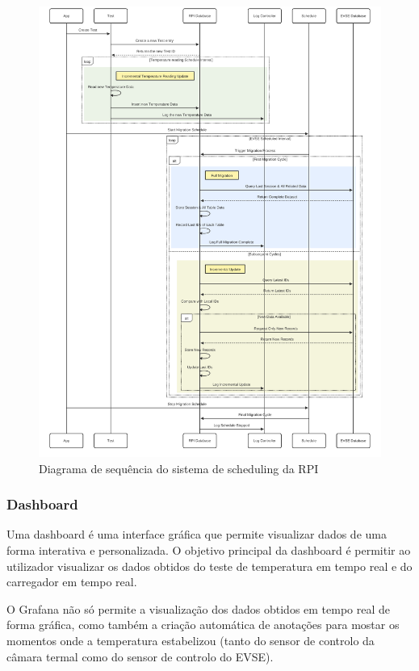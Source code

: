 \begin{figure}[H]
    \centering
    \includegraphics[scale=0.10]{figures/scheduling_2.pdf}
    \caption{Diagrama de sequência do sistema de scheduling da RPI}
    \label{fig:scheduling_2}
\end{figure}

\subsubsection{Dashboard}
Uma dashboard é uma interface gráfica que permite visualizar dados de uma forma interativa e personalizada. O objetivo principal da dashboard 
é permitir ao utilizador visualizar os dados obtidos do teste de temperatura em tempo real e do carregador em tempo real.

O Grafana não só permite a visualização dos dados obtidos em tempo real de forma gráfica, como também a criação automática de anotações
para mostar os momentos onde a temperatura estabelizou (tanto do sensor de controlo da câmara termal como do sensor de controlo do EVSE).

